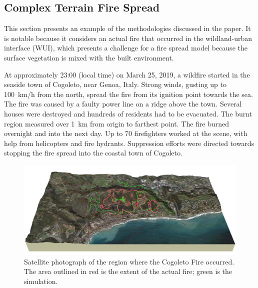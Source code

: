 \documentclass[journal,article,atmosphere,submit,moreauthors,pdftex]{Definitions_Review_Process/mdpi}
\begin{document}
\begin{table}[ht]
\begin{center}
\begin{tabular}{|l|c|c|c|}
\end{tabular}
\end{center}
\end{table}






\subsection{Complex Terrain Fire Spread}  
\label{sec:cogo}

This section presents an example of the methodologies discussed in the paper. It is notable because it considers an actual fire that occurred in the wildland-urban interface (WUI), which presents a challenge for a fire spread model because the surface vegetation is mixed with the built environment.

At approximately 23:00 (local time) on March 25, 2019, a wildfire started in the seaside town of Cogoleto, near Genoa, Italy. Strong winds, gusting up to 100~km/h from the north, spread the fire from its ignition point towards the sea. The fire was caused by a faulty power line on a ridge above the town. Several houses were destroyed and hundreds of residents had to be evacuated. The burnt region measured over 1~km from origin to farthest point. The fire burned overnight and into the next day. Up to 70 firefighters worked at the scene, with help from helicopters and fire hydrants. Suppression efforts were directed towards stopping the fire spread into the coastal town of Cogoleto.

\begin{figure}[ht]
\includegraphics[width=\textwidth]{figures/cogoleto_fire_2019_ls4_1000.png}
\caption{Satellite photograph of the region where the Cogoleto Fire occurred. The area outlined in red is the extent of the actual fire; green is the simulation.}
\label{Cogoleto_satellite}
\end{figure}
\end{document}
